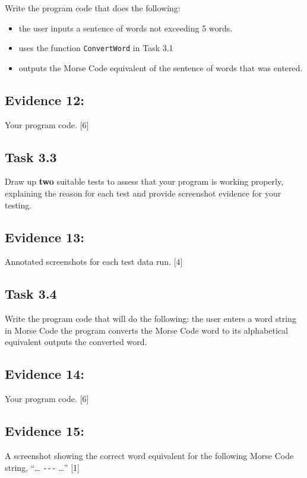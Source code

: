 Write the program code that does the following: 
\begin{itemize}
\item the user inputs a sentence of words not exceeding 5 words. 
\item uses the function \texttt{ConvertWord} in Task 3.1 
\item outputs the Morse Code equivalent of the sentence of words that was
entered. 
\end{itemize}

\subsection*{Evidence 12: }

Your program code. \hfill{} {[}6{]}

\subsection*{Task 3.3}

Draw up \textbf{two} suitable tests to assess that your program is
working properly, explaining the reason for each test and provide
screenshot evidence for your testing. 

\subsection*{Evidence 13: }

Annotated screenshots for each test data run. \hfill{} {[}4{]}

\subsection*{Task 3.4 }

Write the program code that will do the following: the user enters
a word string in Morse Code the program converts the Morse Code word
to its alphabetical equivalent outputs the converted word.

\subsection*{Evidence 14: }

Your program code. \hfill{}{[}6{]}

\subsection*{Evidence 15: }

A screenshot showing the correct word equivalent for the following
Morse Code string, \textquotedblleft \dots{} \texttt{-{}-{}-} \dots \textquotedblright{}
\hfill{}{[}1{]}
